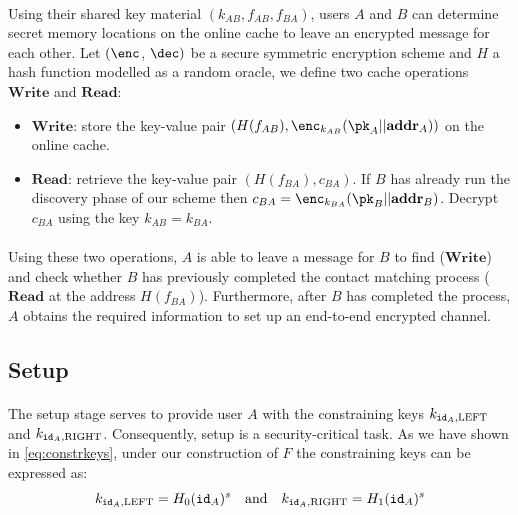 		\paragraph{} Using their shared key material $(k_{AB}, f_{AB}, f_{BA})$, users $A$ and $B$ can determine secret memory locations on the online cache to leave an encrypted message for each other. Let $(\enc$, $\dec)$ be a secure symmetric encryption scheme and $H$ a hash function modelled as a random oracle, we define two cache operations $\mathbf{Write}$ and $\mathbf{Read}$:
		\begin{itemize}
			\item $\mathbf{Write}$: store the key-value pair $(H(f_{AB}), \enc_{k_{AB}}(\pk_A || \addr_A))$ on the online cache.
			\item $\mathbf{Read}$: retrieve the key-value pair $(H(f_{BA}), c_{BA})$. If $B$ has already run the discovery phase of our scheme then $c_{BA} = \enc_{k_{BA}}(\pk_B||\addr_B)$. Decrypt $c_{BA}$ using the key $k_{AB} = k_{BA}$.
		\end{itemize}
		
		\paragraph{} Using these two operations, $A$ is able to leave a message for $B$ to find ($\mathbf{Write}$) and check whether $B$ has previously completed the contact matching process ($\mathbf{Read}$ at the address $H(f_{BA})$). Furthermore, after $B$ has completed the process, $A$ obtains the required information to set up an end-to-end encrypted channel.
	
	\subsection{Setup}
	\label{sec:setup}
		
		\paragraph{}  The setup stage serves to provide user $A$ with the constraining keys $k_{\mathtt{id}_A,\mathrm{LEFT}}$ and $k_{\mathtt{id}_A,\mathrm{RIGHT}}$. Consequently, setup is a security-critical task. As we have shown in \autoref{eq:constrkeys}, under our construction of $F$ the constraining keys can be expressed as:
		\begin{equation}
			k_{\mathtt{id}_A,\mathrm{LEFT}} = H_0(\mathtt{id}_A)^s \quad \mathrm{and} \quad k_{\mathtt{id}_A,\mathrm{RIGHT}} = H_1(\mathtt{id}_A)^s
		\end{equation}
		
